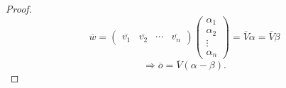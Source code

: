 \begin{proof}
    \[
        \overline{w} = \begin{pmatrix}\overline{v_1} & \overline{v_2} & \cdots & \overline{v_n} \end{pmatrix} \begin{pmatrix} \alpha_1 \\ \alpha_2 \\ \vdots \\ \alpha_n \end{pmatrix} = \overline{V} \alpha = \overline{V} \beta
    \]
    \[
    \Rightarrow \overline{o} = \overline{V} (\alpha - \beta)
    .\] 
\end{proof}

